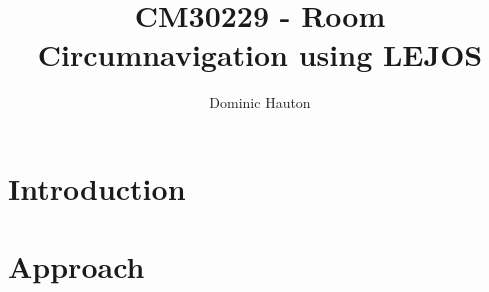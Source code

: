\documentclass[a4paper,10pt]{report}
\title{CM30229 - Room Circumnavigation using LEJOS}
\author{Dominic Hauton}
\begin{document}
\maketitle

\begin{abstract}
\end{abstract}

\section{Introduction}

\section{Approach}


\end{document}
